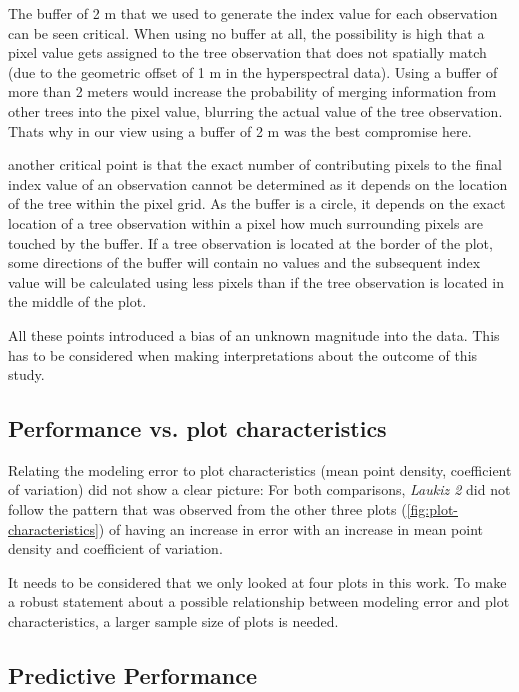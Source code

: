 \documentclass[review]{elsarticle}
\begin{document}
\noindent The buffer of 2 m that we used to generate the index value for each observation can be seen critical.
When using no buffer at all, the possibility is high that a pixel value gets assigned to the tree observation that does not spatially match (due to the geometric offset of 1 m in the hyperspectral data).
Using a buffer of more than 2 meters would increase the probability of merging information from other trees into the pixel value, blurring the actual value of the tree observation.
Thats why in our view using a buffer of 2 m was the best compromise here.

another critical point is that the exact number of contributing pixels to the final index value of an observation cannot be determined as it depends on the location of the tree within the pixel grid.
As the buffer is a circle, it depends on the exact location of a tree observation within a pixel how much surrounding pixels are touched by the buffer.
If a tree observation is located at the border of the plot, some directions of the buffer will contain no values and the subsequent index value will be calculated using less pixels than if the tree observation is located in the middle of the plot.

All these points introduced a bias of an unknown magnitude into the data.
This has to be considered when making interpretations about the outcome of this study.

\subsection{Performance vs. plot characteristics}

\noindent Relating the modeling error to plot characteristics (mean point density, coefficient of variation) did not show a clear picture: For both comparisons, \textit{Laukiz 2} did not follow the pattern that was observed from the other three plots (\autoref{fig:plot-characteristics}) of having an increase in error with an increase in mean point density and coefficient of variation.

It needs to be considered that we only looked at four plots in this work.
To make a robust statement about a possible relationship between modeling error and plot characteristics, a larger sample size of plots is needed.

\subsection{Predictive Performance}
\end{document}
